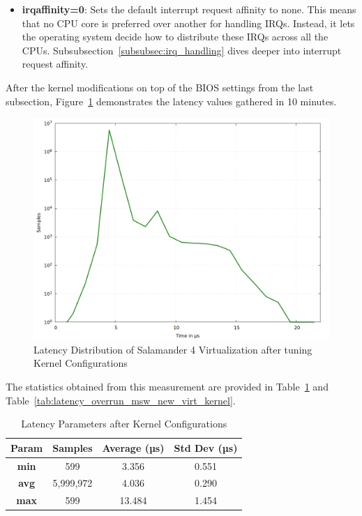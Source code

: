 \documentclass[MMR,Master,english]{twbook}
\begin{document}
\begin{itemize}
	\item \textbf{irqaffinity=0}: Sets the default interrupt request affinity to none. This means that no CPU core is preferred over another for handling IRQs. Instead, it lets the operating system decide how to distribute these IRQs across all the CPUs. Subsubsection~\ref{subsubsec:irq_handling} dives deeper into interrupt request affinity.
\end{itemize}

\clearpage

\noindent After the kernel modifications on top of the BIOS settings from the last subsection, Figure~\ref{fig:gnuplot_max_latency_rt_kernelparam} demonstrates the latency
values gathered in 10 minutes.

\begin{figure}[H]
	\centering
	\includegraphics[width=0.7\columnwidth]{masterthesis-documentation/docs/sigmatek/xenomai/4rt_kernelparam/gnuplot_max_latency_rt_kernelparam.png}
	\caption[Latency Distribution of Salamander 4 after Kernel Configurations]{Latency Distribution of Salamander 4 Virtualization after tuning Kernel Configurations}
	\label{fig:gnuplot_max_latency_rt_kernelparam}
\end{figure}

\noindent The statistics obtained from this measurement are provided in Table~\ref{tab:latency_stats_kernelparam} and Table~\ref{tab:latency_overrun_msw_new_virt_kernel}.

\begin{table}[H]
	\centering
	\caption{Latency Parameters after Kernel Configurations}
	\label{tab:latency_stats_kernelparam}
	\begin{tabular}{|c|c|c|c|}
		\hline
		\textbf{Param} & \textbf{Samples} & \textbf{Average (µs)} & \textbf{Std Dev (µs)} \\ \hline
		\textbf{min}   & 599              & 3.356                 & 0.551                 \\ \hline
		\textbf{avg}   & 5,999,972        & 4.036                 & 0.290                 \\ \hline
		\textbf{max}   & 599              & 13.484                & 1.454                 \\ \hline
	\end{tabular}
\end{table}
\end{document}
